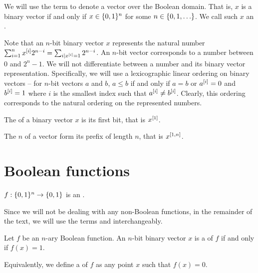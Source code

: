 \begin{definition}
We will use the term 
to denote a vector over the Boolean domain.
That is, $x$ is a binary vector if and only if
$x \in \{0, 1\}^n$ for some $n \in \{0, 1, \ldots\}$.
We call such $x$ an .
\end{definition}

Note that an $n$-bit binary vector $x$
represents the natural number
$\sum_{i = 1}^n x^{[i]} 2^{n-i}
= \sum_{i|x^{[i]}=1} 2^{n-i}$.
An $n$-bit vector
corresponds to a number between $0$ and $2^n - 1$.
We will not differentiate between a number
and its binary vector representation.
Specifically,
we will use a lexicographic linear ordering
on binary vectors --
for $n$-bit vectors $a$ and $b$,
$a \leq b$ if and only if $a = b$ or
$a^{[i]} = 0$ and $b^{[i]} = 1$
where $i$ is the smallest index such that
$a^{[i]} \neq b^{[i]}$.
Clearly,
this ordering corresponds to the natural ordering
on the represented numbers.

\begin{definition}
The  of a binary vector $x$
is its first bit,
that is $x^{[1]}$.

The $n$  of a vector
form its prefix of length $n$,
that is $x^{[1, n]}$.
\end{definition}

\section{Boolean functions}

\begin{definition}
$f: \{0, 1\}^n \rightarrow \{0, 1\}$ is
an .
\end{definition}

Since we will not be dealing with any non-Boolean functions,
in the remainder of the text,
we will use the terms
 and 
interchangeably.

\begin{definition}
Let $f$ be an $n$-ary Boolean function.
An $n$-bit binary vector $x$ is a 
of $f$ if and only if $f(x)  = 1$.
\end{definition}

Equivalently,
we define a  of $f$
as any point $x$
such that $f(x) = 0$.

